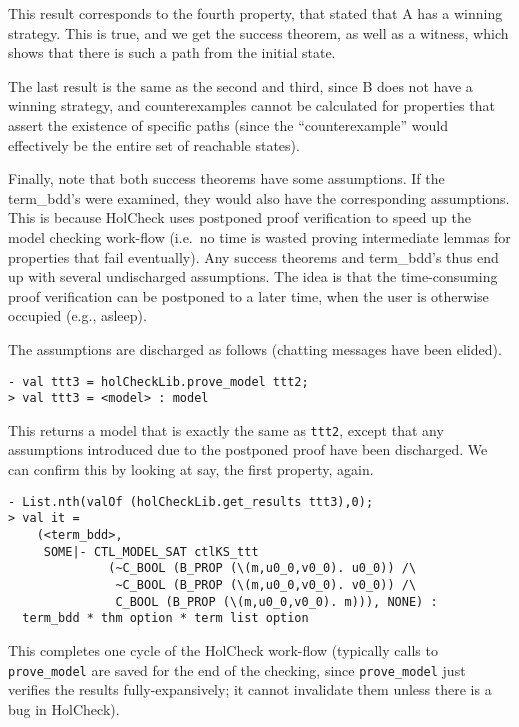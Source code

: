\documentclass[12pt,fleqn]{article}
\newcommand{\hc}{HolCheck}
\begin{document}
This result corresponds to the fourth property, that stated that A has a winning strategy. This is true, and we get the success theorem, as well as a witness, which shows that there is such a path from the initial state.

The last result is the same as the second and third, since B does not have a winning strategy, and counterexamples cannot be calculated for properties that assert the existence of specific paths (since the ``counterexample'' would effectively be the entire set of reachable states).

Finally, note that both success theorems have some assumptions. If the term\_bdd's were examined, they would also have the corresponding assumptions. This is because \hc{} uses postponed proof verification to speed up the model checking work-flow (i.e.\ no time is wasted proving intermediate lemmas for properties that fail eventually). Any success theorems and term\_bdd's thus end up with several undischarged assumptions. The idea is that the time-consuming proof verification can be postponed to a later time, when the user is otherwise occupied (e.g., asleep).

The assumptions are discharged as follows (chatting messages have been elided).

\begin{session}\begin{verbatim}
- val ttt3 = holCheckLib.prove_model ttt2;
> val ttt3 = <model> : model
\end{verbatim}\end{session}

This returns a model that is exactly the same as \texttt{ttt2}, except that any assumptions introduced due to the postponed proof have been discharged. We can confirm this by looking at say, the first property, again.

\begin{session}\begin{verbatim}
- List.nth(valOf (holCheckLib.get_results ttt3),0);
> val it =
    (<term_bdd>,
     SOME|- CTL_MODEL_SAT ctlKS_ttt
              (~C_BOOL (B_PROP (\(m,u0_0,v0_0). u0_0)) /\
               ~C_BOOL (B_PROP (\(m,u0_0,v0_0). v0_0)) /\
               C_BOOL (B_PROP (\(m,u0_0,v0_0). m))), NONE) :
  term_bdd * thm option * term list option
\end{verbatim}\end{session}

This completes one cycle of the \hc{} work-flow (typically calls to \texttt{prove\_model} are saved for the end of the checking, since  \texttt{prove\_model} just verifies the results fully-expansively; it cannot invalidate them unless there is a bug in \hc{}).
\end{document}
